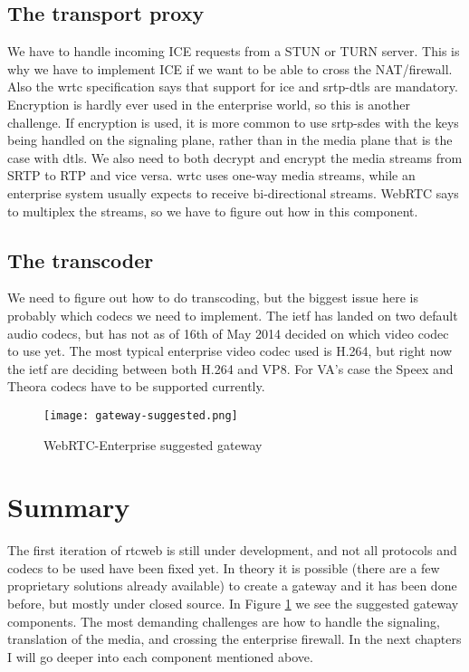 \subsection{The transport proxy}
We have to handle incoming ICE requests from a STUN or TURN server. This is why we have to implement ICE if we want to be able to cross the NAT/firewall. Also the \gls{wrtc} specification says that support for \gls{ice} and \gls{srtp}-\gls{dtls} are mandatory. Encryption is hardly ever used in the enterprise world, so this is another challenge. If encryption is used, it is more common to use \gls{srtp}-\gls{sdes} with the keys being handled on the signaling plane, rather than in the media plane that is the case with \gls{dtls}. We also need to both decrypt and encrypt the media streams from SRTP to RTP and vice versa. \gls{wrtc} uses one-way media streams, while an enterprise system usually expects to receive bi-directional streams. WebRTC says to multiplex the streams, so we have to figure out how in this component.

\subsection{The transcoder}
We need to figure out how to do transcoding, but the biggest issue here is probably which codecs we need to implement. The \gls{ietf} has landed on two default audio codecs, but has not as of 16th of May 2014 decided on which video codec to use yet. The most typical enterprise video codec used is H.264, but right now the \gls{ietf} are deciding between both H.264 and VP8. For VA's case the Speex and Theora codecs have to be supported currently.
\\
\begin{figure}[here]
\centerline{\texttt{[image: gateway-suggested.png]}}
\caption{WebRTC-Enterprise suggested gateway}
\label{fig:gateway}
\end{figure}

\section{Summary}
The first iteration of \gls{rtcweb} is still under development, and not all protocols and codecs to be used have been fixed yet. In theory it is possible (there are a few proprietary solutions already available) to create a gateway and it has been done before, but mostly under closed source. In Figure \ref{fig:gateway} we see the suggested gateway components. The most demanding challenges are how to handle the signaling, translation of the media, and crossing the enterprise firewall. In the next chapters I will go deeper into each component mentioned above.